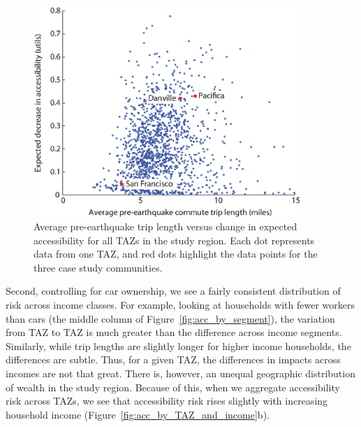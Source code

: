 
%
\begin{figure}[htb!]
\centering
\includegraphics[width=4in]{FIGS/equity_accLengthv4.eps} 
\caption{Average pre-earthquake trip length versus change in expected accessibility for all TAZs in the study region. Each dot represents data from one TAZ, and red dots highlight the data points for the three case study communities.}
\label{fig:accLength}
\end{figure}



Second, controlling for car ownership, we see a fairly consistent distribution of risk across income classes.  For example, looking at households with fewer workers than cars (the middle column of Figure~\ref{fig:acc_by_segment}), the variation from TAZ to TAZ is much greater than the difference across income segments. Similarly, while trip lengths are slightly longer for higher income households, the differences are subtle. %
Thus, for a given TAZ, the differences in impacts across incomes are not that great. There is, however, an unequal geographic distribution of wealth in the study region. Because of this, when we aggregate accessibility risk across TAZs, we see that accessibility risk rises slightly with increasing household income  (Figure~\ref{fig:acc_by_TAZ_and_income}{b}). 


